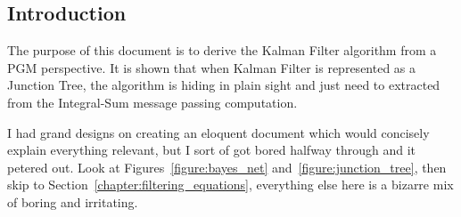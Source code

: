 \begin{center}
\section*{Introduction}
\end{center}
The purpose of this document is to derive the Kalman Filter algorithm from a PGM perspective. It is shown that when Kalman Filter is represented as a Junction Tree, the algorithm is hiding in plain sight and just need to extracted from the Integral-Sum message passing computation.

I had grand designs on creating an eloquent document which would concisely explain everything relevant, but I sort of got bored halfway through and it petered out. Look at Figures~\ref{figure:bayes_net} and~\ref{figure:junction_tree}, then skip to Section~\ref{chapter:filtering_equations}, everything else here is a bizarre mix of boring and irritating.